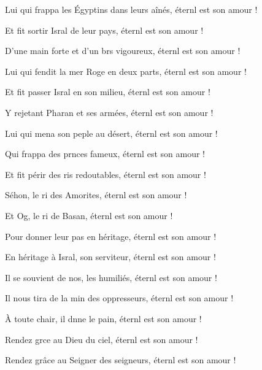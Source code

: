 \item Lui qui frappa les Égyptins dans leurs aînés,\psstar{} éternl est son amour !
\item Et fit sortir Isral de leur pays,\psstar{} éternl est son amour !
\item D’une main forte et d’un brs vigoureux,\psstar{} éternl est son amour !
\item Lui qui fendit la mer Roge en deux parts,\psstar{} éternl est son amour !
\item Et fit passer Isral en son milieu,\psstar{} éternl est son amour !
\item Y rejetant Pharan et ses armées,\psstar{} éternl est son amour !
\item Lui qui mena son peple au désert,\psstar{} éternl est son amour !
\item Qui frappa des prnces fameux,\psstar{} éternl est son amour !
\item Et fit périr des ris redoutables,\psstar{} éternl est son amour !
\item Séhon, le ri des Amorites,\psstar{} éternl est son amour !
\item Et Og, le ri de Basan,\psstar{} éternl est son amour !
\item Pour donner leur pas en héritage,\psstar{} éternl est son amour !
\item En héritage à Isral, son serviteur,\psstar{} éternl est son amour !
\item Il se souvient de nos, les humiliés,\psstar{} éternl est son amour !
\item Il nous tira de la min des oppresseurs,\psstar{} éternl est son amour !
\item À toute chair, il dnne le pain,\psstar{} éternl est son amour !
\item Rendez grce au Dieu du ciel,\psstar{} éternl est son amour !
\item Rendez grâce au Seigner des seigneurs,\psstar{} éternl est son amour !